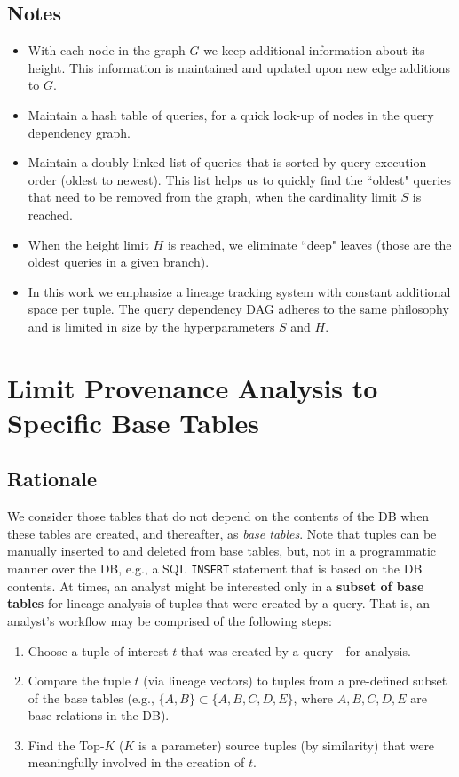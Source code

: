 \subsection{Notes} 
\begin{itemize}
    \item With each node in the graph $G$ we keep additional information about its height. This information is maintained and updated upon new edge additions to $G$.
    \item Maintain a hash table of queries, for a quick look-up of nodes in the query dependency graph.
    \item Maintain a doubly linked list of queries that is sorted by query execution order (oldest to newest). This list helps us to quickly find the ``oldest" queries that need to be removed from the graph, when the cardinality limit $S$ is reached.
    \item When the height limit $H$ is reached, we eliminate ``deep" leaves (those are the oldest queries in a given branch).
    \item In this work we emphasize a lineage tracking system with constant additional space per tuple. The query dependency DAG adheres to the same philosophy and is limited in size by the hyperparameters $S$ and $H$.
\end{itemize}


\section{Limit Provenance Analysis to Specific Base Tables}

\subsection{Rationale}
We consider those tables that do not depend on the contents of the DB when these tables are created, and thereafter, as \textit{base tables}. Note that tuples can be manually inserted to and deleted from base tables, but, not in a programmatic manner over the DB, e.g., a SQL \texttt{INSERT} statement that is based on the DB contents.
At times, an analyst might be interested only in a \textbf{subset of base tables} for lineage analysis of tuples that were created by a query. That is, an analyst's workflow may be comprised of the following steps:
\begin{enumerate}
    \item Choose a tuple of interest $t$ that was created by a query - for analysis.
    \item Compare the tuple $t$ (via lineage vectors) to tuples from a pre-defined subset of the base tables (e.g., $\{{A, B}\} \subset \{{A,B,C,D,E}\}$, where $A,B,C,D,E$ are base relations in the DB).
    \item Find the Top-$K$ ($K$ is a parameter) source tuples (by similarity) that were meaningfully involved in the creation of $t$. 
\end{enumerate}


